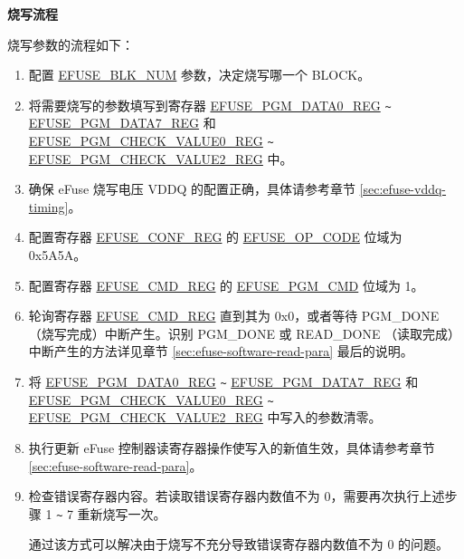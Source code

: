\documentclass[main\_\_CN.tex]{subfiles}
\begin{document}
{\bfseries 烧写流程}

烧写参数的流程如下：
\begin{enumerate}
\item 配置 \hyperref[fielddesc:EFUSEBLKNUM]{EFUSE\_BLK\_NUM} 参数，决定烧写哪一个 BLOCK。

\item 将需要烧写的参数填写到寄存器 \hyperref[regdesc:EFUSEPGMDATA0REG]{EFUSE\_PGM\_DATA0\_REG} \verb+~+ \hyperref[regdesc:EFUSEPGMDATA7REG]{EFUSE\_PGM\_DATA7\_REG} 和\\ \hyperref[regdesc:EFUSEPGMCHECKVALUE0REG]{EFUSE\_PGM\_CHECK\_VALUE0\_REG}  \verb+~+  \hyperref[regdesc:EFUSEPGMCHECKVALUE2REG]{EFUSE\_PGM\_CHECK\_VALUE2\_REG} 中。


\item 确保 eFuse 烧写电压 VDDQ 的配置正确，具体请参考章节 \ref{sec:efuse-vddq-timing}。

\item 配置寄存器 \hyperref[regdesc:EFUSECONFREG]{EFUSE\_CONF\_REG} 的 \hyperref[fielddesc:EFUSEOPCODE]{EFUSE\_OP\_CODE} 位域为 0x5A5A。

\item 配置寄存器 \hyperref[regdesc:EFUSECMDREG]{EFUSE\_CMD\_REG} 的 \hyperref[fielddesc:EFUSEPGMCMD]{EFUSE\_PGM\_CMD} 位域为 1。

\item 轮询寄存器 \hyperref[regdesc:EFUSECMDREG]{EFUSE\_CMD\_REG} 直到其为 0x0，或者等待 PGM\_DONE（烧写完成）中断产生。识别 PGM\_DONE 或 READ\_DONE （读取完成）中断产生的方法详见章节 \ref{sec:efuse-software-read-para} 最后的说明。

\item 将 \hyperref[regdesc:EFUSEPGMDATA0REG]{EFUSE\_PGM\_DATA0\_REG} \verb+~+ \hyperref[regdesc:EFUSEPGMDATA7REG]{EFUSE\_PGM\_DATA7\_REG} 和\\ \hyperref[regdesc:EFUSEPGMCHECKVALUE0REG]{EFUSE\_PGM\_CHECK\_VALUE0\_REG}  \verb+~+  \hyperref[regdesc:EFUSEPGMCHECKVALUE2REG]{EFUSE\_PGM\_CHECK\_VALUE2\_REG} 中写入的参数清零。

\item 执行更新 eFuse 控制器读寄存器操作使写入的新值生效，具体请参考章节 \ref{sec:efuse-software-read-para}。
\item 检查错误寄存器内容。若读取错误寄存器内数值不为 0，需要再次执行上述步骤 1 \verb+~+ 7 重新烧写一次。

通过该方式可以解决由于烧写不充分导致错误寄存器内数值不为 0 的问题。


\end{enumerate}
\end{document}
